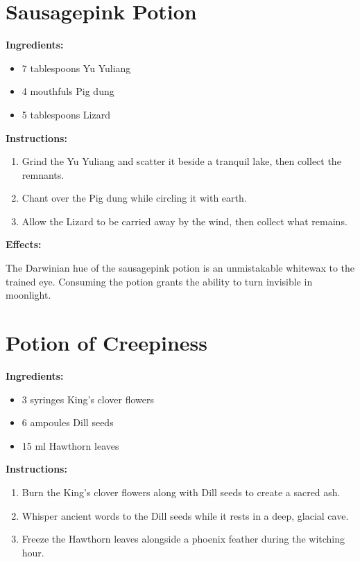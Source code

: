 \documentclass{article}
\begin{document}
\newpage
\section*{Sausagepink Potion}

\textbf{Ingredients:}

\begin{itemize}
  \item 7 tablespoons Yu Yuliang
  \item 4 mouthfuls Pig dung
  \item 5 tablespoons Lizard
\end{itemize}

\textbf{Instructions:}

\begin{enumerate}
  \item Grind the Yu Yuliang and scatter it beside a tranquil lake, then collect the remnants.
  \item Chant over the Pig dung while circling it with earth.
  \item Allow the Lizard to be carried away by the wind, then collect what remains.
\end{enumerate}

\textbf{Effects:}

The Darwinian hue of the sausagepink potion is an unmistakable whitewax to the trained eye. Consuming the potion grants the ability to turn invisible in moonlight.

\newpage
\section*{Potion of Creepiness}

\textbf{Ingredients:}

\begin{itemize}
  \item 3 syringes King's clover flowers
  \item 6 ampoules Dill seeds
  \item 15 ml Hawthorn leaves
\end{itemize}

\textbf{Instructions:}

\begin{enumerate}
  \item Burn the King's clover flowers along with Dill seeds to create a sacred ash.
  \item Whisper ancient words to the Dill seeds while it rests in a deep, glacial cave.
  \item Freeze the Hawthorn leaves alongside a phoenix feather during the witching hour.
\end{enumerate}
\end{document}
